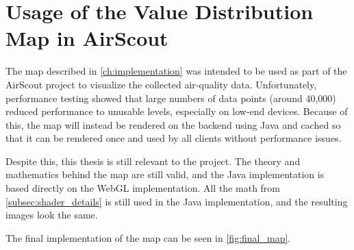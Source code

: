 \chapter{Usage of the Value Distribution Map in AirScout}

The map described in \autoref{ch:implementation} was intended to be used as part of the AirScout project to visualize the collected air-quality data. Unfortunately, performance testing showed that large numbers of data points (around 40,000) reduced performance to unusable levels, especially on low-end devices. Because of this, the map will instead be rendered on the backend using Java and cached so that it can be rendered once and used by all clients without performance issues.

Despite this, this thesis is still relevant to the project. The theory and mathematics behind the map are still valid, and the Java implementation is based directly on the WebGL implementation. All the math from \autoref{subsec:shader_details} is still used in the Java implementation, and the resulting images look the same.

The final implementation of the map can be seen in \autoref{fig:final_map}.
